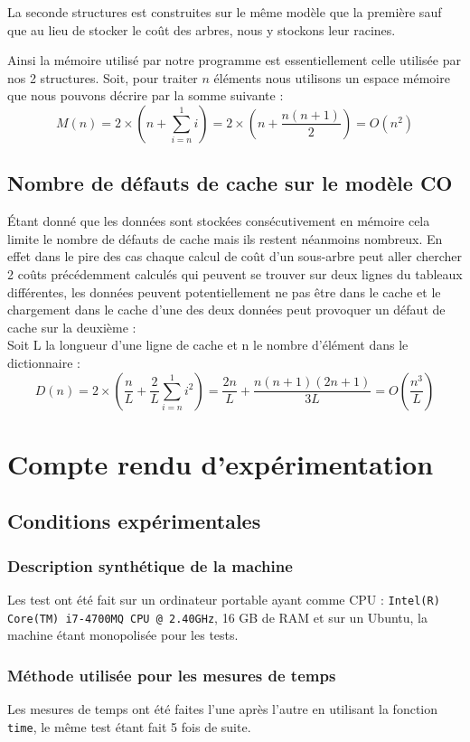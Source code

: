 \documentclass[a4paper, 10pt, french]{article}
\begin{document}
  La seconde structures est construites sur le même modèle que la première sauf que au lieu de stocker le coût des arbres, nous y stockons leur racines.

    Ainsi la mémoire utilisé par notre programme est essentiellement celle utilisée par nos 2 structures. Soit, pour traiter $n$ éléments nous utilisons un espace mémoire que nous pouvons décrire par la somme suivante :
    $$M(n) = 2 \times (n + \sum_{i=n}^{1} i) = 2 \times (n + \frac{n(n+1)}{2}) = O(n^2)$$

  \subsection{Nombre de défauts de cache sur le modèle CO}
    Étant donné que les données sont stockées consécutivement en mémoire cela limite le nombre de défauts de cache mais ils restent néanmoins nombreux. En effet dans le pire des cas chaque calcul de coût d'un sous-arbre peut aller chercher 2 coûts précédemment calculés qui peuvent se trouver sur deux lignes du tableaux différentes, les données peuvent potentiellement ne pas être dans le cache et le chargement dans le cache d'une des deux données peut provoquer un défaut de cache sur la deuxième  : \\
    Soit L la longueur d'une ligne de cache et n le nombre d'élément dans le dictionnaire :
     $$D(n) = 2 \times (\frac{n}{L} + \frac{2}{L} \sum_{i=n}^{1} i^2)
            = \frac{2n}{L} + \frac{n(n+1)(2n+1)}{3L}
            = O(\frac{n^3}{L})$$






\section{Compte rendu d'expérimentation}
  \subsection{Conditions expérimentales}
    \subsubsection{Description synthétique de la machine}
      Les test ont été fait sur un ordinateur portable ayant comme CPU : {\tt Intel(R) Core(TM) i7-4700MQ CPU @ 2.40GHz}, 16 GB de RAM et sur un Ubuntu, la machine étant monopolisée pour les tests.

    \subsubsection{Méthode utilisée pour les mesures de temps}
      Les mesures de temps ont été faites l'une après l'autre en utilisant la fonction {\tt time}, le même test étant fait 5 fois de suite.
\end{document}
